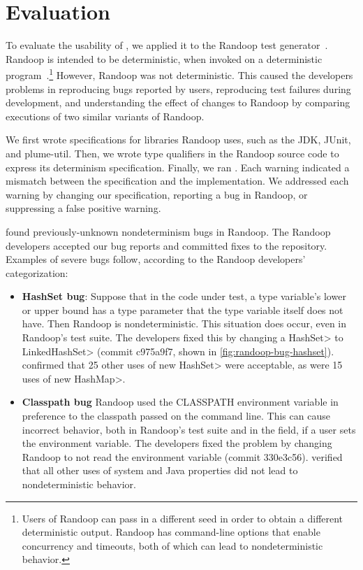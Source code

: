 \section{Evaluation\label{sec:results}}
To evaluate the usability of \theDeterminismChecker,
we applied it to the Randoop test
generator~\cite{PachecoLEB2007}.
Randoop is intended to be deterministic, when invoked on a deterministic
program~\cite{randoop-manual}.\footnote{Users of Randoop can pass in a different seed in order to
    obtain a different deterministic output.  Randoop has command-line
    options that enable concurrency and timeouts, both of which can lead to
    nondeterministic behavior.}
However, Randoop was not deterministic.  This caused the developers
problems in 
reproducing bugs reported by users, 
reproducing test failures during development, and
understanding the effect of changes to Randoop by comparing executions of two
similar variants of Randoop.

We first wrote specifications for libraries Randoop uses, such as the JDK,
JUnit, and plume-util.
Then, we wrote type qualifiers in the Randoop source code to express its
determinism specification.
Finally, we ran
\theDeterminismChecker.  Each warning indicated a mismatch between the
specification and the implementation.  We addressed each warning by changing our
specification, reporting a bug in Randoop, or suppressing a false positive warning.

\TheDeterminismChecker found \numRandoopBugs previously-unknown nondeterminism bugs in Randoop.
The Randoop developers accepted our bug reports and committed fixes to the repository. Examples
of severe bugs follow, according to the Randoop developers' categorization:

\begin{itemize}
    \item
    \textbf{HashSet bug}: Suppose that in the code under test, a type variable's lower or upper
    bound has a type parameter that the type variable itself does not have. Then Randoop is nondeterministic.
    This situation does occur, even in Randoop's test suite.
    The developers fixed this by changing a \<HashSet> to \<LinkedHashSet>
    (commit c975a9f7, shown in \cref{fig:randoop-bug-hashset}).
    \TheDeterminismChecker confirmed that 
    25 other uses of \<new HashSet> were acceptable, as were 15 uses of \<new HashMap>.
    \item
    \textbf{Classpath bug}
    Randoop used the CLASSPATH environment variable in preference to the
    classpath passed on the command line.
    This can cause incorrect behavior, both in Randoop's test suite and in the field,
    if a user sets the environment variable.
    The developers fixed the problem by changing Randoop to not read the environment variable
    (commit 330e3c56).
    \TheDeterminismChecker verified that all other uses of system and Java
    properties did not lead to nondeterministic behavior.
\end{itemize}

